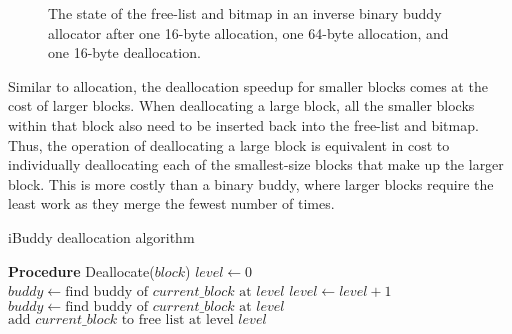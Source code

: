\begin{figure}[h]
  \centering
  
  \caption{The state of the free-list and bitmap in an inverse binary buddy allocator after one
    16-byte allocation, one 64-byte allocation, and one 16-byte deallocation.}
  \label{fig:ibuddydeallocated}
\end{figure}

Similar to allocation, the deallocation speedup for smaller blocks comes at the cost of larger blocks. When deallocating a large block, all the smaller blocks within that block also need to be inserted back into the free-list and bitmap. Thus, the operation of deallocating a large block is equivalent in cost to individually deallocating each of the smallest-size blocks that make up the larger block. This is more costly than a binary buddy, where larger blocks require the least work as they merge the fewest number of times.

\begin{algorithm}[H]
  \caption{iBuddy deallocation algorithm}
  \label{alg:ibuddy_dealloc}
  \begin{algorithmic}[1]
    \Statex \textbf{Procedure} Deallocate($block$)
    \State $level \gets 0$
    \State $buddy \gets \text{find buddy of } current\_block \text{ at } level$
    \State $level \gets level + 1$
    \State $buddy \gets \text{find buddy of } current\_block \text{ at } level$
    \EndWhile
    \State $\text{add } current\_block \text{ to free list at level } level$
    \EndFor

  \end{algorithmic}
\end{algorithm}